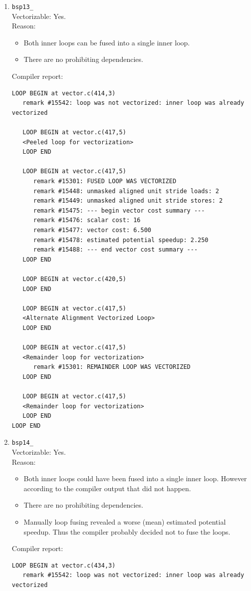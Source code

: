 \documentclass[11pt]{article}
\begin{document}
\begin{enumerate}
\item \texttt{bsp13\_}\\
Vectorizable: Yes.\\
Reason:
\begin{itemize}
\item Both inner loops can be fused into a single inner loop.
\item There are no prohibiting dependencies.
\end{itemize}
Compiler report:
\begin{lstlisting}
LOOP BEGIN at vector.c(414,3)
   remark #15542: loop was not vectorized: inner loop was already vectorized

   LOOP BEGIN at vector.c(417,5)
   <Peeled loop for vectorization>
   LOOP END

   LOOP BEGIN at vector.c(417,5)
      remark #15301: FUSED LOOP WAS VECTORIZED
      remark #15448: unmasked aligned unit stride loads: 2 
      remark #15449: unmasked aligned unit stride stores: 2 
      remark #15475: --- begin vector cost summary ---
      remark #15476: scalar cost: 16 
      remark #15477: vector cost: 6.500 
      remark #15478: estimated potential speedup: 2.250 
      remark #15488: --- end vector cost summary ---
   LOOP END

   LOOP BEGIN at vector.c(420,5)
   LOOP END

   LOOP BEGIN at vector.c(417,5)
   <Alternate Alignment Vectorized Loop>
   LOOP END

   LOOP BEGIN at vector.c(417,5)
   <Remainder loop for vectorization>
      remark #15301: REMAINDER LOOP WAS VECTORIZED
   LOOP END

   LOOP BEGIN at vector.c(417,5)
   <Remainder loop for vectorization>
   LOOP END
LOOP END
\end{lstlisting}

\item \texttt{bsp14\_}\\
Vectorizable: Yes.\\
Reason:
\begin{itemize}
\item Both inner loops could have been fused into a single inner loop. However according to the compiler output that did not happen.
\item There are no prohibiting dependencies.
\item Manually loop fusing revealed a worse (mean) estimated potential speedup. Thus the compiler probably decided not to fuse the loops.
\end{itemize}
Compiler report:
\begin{lstlisting}
LOOP BEGIN at vector.c(434,3)
   remark #15542: loop was not vectorized: inner loop was already vectorized


\end{lstlisting}
\end{enumerate}
\end{document}

